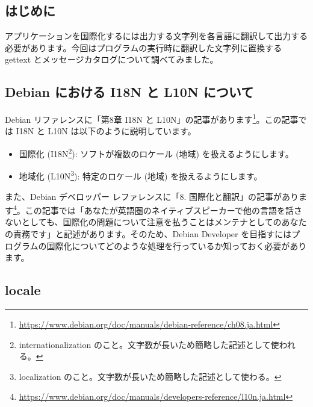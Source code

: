 \documentclass[mingoth,a4paper]{jsarticle}
\begin{document}



\subsection{はじめに}

アプリケーションを国際化するには出力する文字列を各言語に翻訳して出力する必要があります。今回はプログラムの実行時に翻訳した文字列に置換する gettext とメッセージカタログについて調べてみました。

\subsection{Debian における I18N と L10N について}

Debian リファレンスに「第8章 I18N と L10N」の記事があります\footnote{\url{https://www.debian.org/doc/manuals/debian-reference/ch08.ja.html}}。この記事では I18N と L10N は以下のように説明しています。

\begin{itemize}
\item 国際化 (I18N\footnote{internationalization のこと。文字数が長いため簡略した記述として使われる。}): ソフトが複数のロケール (地域) を扱えるようにします。
\item 地域化 (L10N\footnote{localization のこと。文字数が長いため簡略した記述として使わる。}): 特定のロケール (地域) を扱えるようにします。 
\end{itemize}

また、Debian デベロッパー レファレンスに「8. 国際化と翻訳」の記事があります\footnote{\url{https://www.debian.org/doc/manuals/developers-reference/l10n.ja.html}}。この記事では「あなたが英語圏のネイティブスピーカーで他の言語を話さないとしても、国際化の問題について注意を払うことはメンテナとしてのあなたの責務です」と記述があります。そのため、Debian Developer を目指すにはプログラムの国際化についてどのような処理を行っているか知っておく必要があります。


\subsection{locale}
\end{document}
